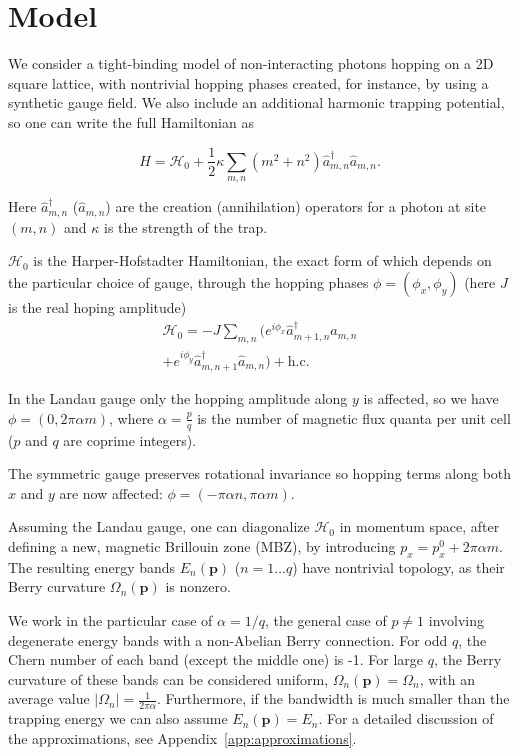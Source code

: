 \documentclass[twocolumn, 10pt, aps, superscriptaddress, floatfix, showpacs, prb, citeautoscript]{revtex4-1}
\newcommand{\vt}[1]{\mathbf{#1}}
\begin{document}
\section{Model}
\label{sec:model}

We consider a tight-binding model of non-interacting photons hopping
on a 2D square lattice, with nontrivial hopping phases created, for
instance, by using a synthetic gauge field. We also include an
additional harmonic trapping potential, so one can write the full Hamiltonian as

\begin{equation}\label{eq:model}
H=\mathcal{H}_0+\frac{1}{2}\kappa
\sum_{m,n}(m^{2}+n^{2})\hat{a}_{m,n}^{\dagger}\hat{a}_{m,n}.
\end{equation}

Here $\hat{a}_{m,n}^{\dagger}$ ($\hat{a}_{m,n}$) are the creation
(annihilation) operators for a photon at site $(m,n)$ and $\kappa$ is the
strength of the trap.

$\mathcal{H}_0$ is the Harper-Hofstadter Hamiltonian, the exact form
of which depends on the particular choice of gauge, through the
hopping phases $\phi = (\phi_x, \phi_y)$ (here $J$ is the real hoping
amplitude)
%
\begin{multline}\label{eq:hh_hamiltonian}
\mathcal{H}_0=-J\sum_{m,n}(e^{i \phi_x}\hat{a}_{m+1,n}^{\dagger}\hat{a}_{m,n}\\
+e^{i \phi_y}\hat{a}_{m,n+1}^{\dagger}\hat{a}_{m,n}) + \text{h.c.}
\end{multline}


In the Landau gauge only the hopping amplitude along $y$ is affected,
so we have $\phi = (0, 2\pi\alpha m)$, where $\alpha = \frac{p}{q}$ is
the number of magnetic flux quanta per unit cell ($p$ and $q$ are
coprime integers).

The symmetric gauge preserves rotational invariance so hopping terms
along both $x$ and $y$ are now affected: $\phi = (-\pi\alpha n,  \pi\alpha m)$.

Assuming the Landau gauge, one can diagonalize $\mathcal{H}_0$ in
momentum space, after defining a new, magnetic Brillouin zone (MBZ),
by introducing $p_x = p_x^0 + 2\pi \alpha m$. The resulting energy
bands $E_n(\vt{p})$ ($n = 1 \dots q$) have nontrivial topology, as
their Berry curvature $\Omega_n(\vt{p})$ is nonzero.

We work in the particular case of $\alpha=1/q$, the general case of
$p \neq 1$ involving degenerate energy bands with a non-Abelian Berry
connection.  For odd $q$, the Chern number of each band (except the
middle one) is -1. For large $q$, the Berry curvature of these bands
can be considered uniform, $\Omega_n(\vt{p}) = \Omega_n$, with an
average value $|\Omega_n| = \frac{1}{2\pi\alpha}$. Furthermore, if the
bandwidth is much smaller than the trapping energy we can also assume
$E_n(\vt{p}) = E_n$. For a detailed discussion of the approximations,
see Appendix~\ref{app:approximations}.
\end{document}
